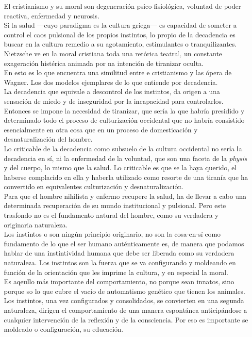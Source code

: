 \documentclass[a4paper, 10pt, twocolumn, spanish]{article}
\begin{document}
El cristianismo y su moral son degeneración psico-fisiológica,
voluntad de poder reactiva, enfermedad y neurosis.\\[0pt]
Si la salud —cuyo paradigma es la cultura griega— es capacidad de
someter a control el caos pulsional de los propios instintos, lo
propio de la decadencia es buscar en la cultura remedio a su
agotamiento, estimulantes o tranquilizantes.\\[0pt]

Nietzsche ve en la moral cristiana toda una retórica teatral, un
constante exageración histérica animada por na intención de tiranizar
oculta.\\[0pt]
En esto es lo que encuentra una similitud entre e cristianismo y las
ópera de Wagner. Los dos modelos ejemplares de lo que entiende por
decadencia.\\[0pt]
La decadencia que equivale a descontrol de los instintos, da origen a
una sensación de miedo y de inseguridad por la incapacidad para
controlarlos. Entonces se impone la necesidad de tiranizar, que sería
la que habría presidido y determinado todo el proceso de culturización
occidental que no habría consistido esencialmente en otra cosa que en
un proceso de domesticación y desnaturalización del hombre.\\[0pt]

Lo criticable de la decadencia como subsuelo de la cultura occidental
no sería la decadencia en sí, ni la enfermedad de la voluntad, que son
una faceta de la \emph{physis} y del cuerpo, lo mismo que la salud. Lo
criticable es que se la haya querido, el haberse complacido en ella y
haberla utilizado como resorte de una tiranía que ha convertido en
equivalentes culturización y desnaturalización.\\[0pt]

Para que el hombre nihilista y enfermo recupere la salud, ha de llevar
a cabo una determinada recuperación de su mundo institucional y
pulsional. Pero este trasfondo no es el fundamento natural del hombre,
como su verdadera y originaria naturaleza.\\[0pt]
Los instintos o son ningún principio originario, no son la cosa-en-sí
como fundamento de lo que el ser humano auténticamente es, de manera
que podamos hablar de una instintividad humana que debe ser liberada
como su verdadera naturaleza. Los instintos son la fuerza que se va
configurando y moldeando en función de la orientación que les imprime
la cultura, y en especial la moral.\\[0pt]
Es aqeullo más importante del comportamiento, no porque sean innatos,
sino porque so lo que cubre el vacío de automatismo genético que
tienen los animales.\\[0pt]
Los instintos, una vez configurados y consolidados, se convierten en
una segunda naturaleza, dirigen el comportamiento de una manera
espontánea anticipándose a cualquier intervención de la reflexión y de
la consciencia. Por eso es importante se moldeado o configuración, su
educación.\\[0pt]
\end{document}
